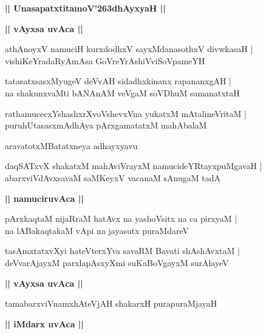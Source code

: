\documentclass[twoside,12pt,openright]{book}
\def\S{\char'263}
\newcounter{shloka}[chapter]
\def\uvaca#1{\centerline{{\large\textbf{#1}}}}
\begin{document}
\begin{center}
{\LARGE\bfseries || UnasapatxtitamoV\S dhAyxyaH || }
\end{center}

\uvaca{|| vAyxsa uvAca ||}

\begin{shloka}%
athAnoyxV namuciH kurxdodhxV sayxMdanasothxV divwkasaH |\\
vishiKeYradaRyAmAsa GoVreYrAshiVviSoVpameYH
\end{shloka}

\begin{shloka}%
tatasatxsasxMyugeV deVvAH sidadhxkinanx rapananxgAH |\\
na shakunxvaMti bANAnAM veVgaM soVDhuM samanatxtaH 
\end{shloka}

\begin{shloka}%
rathamucecxYshashxrXvoVshevxVna yukatxM mAtalineVritaM |\\
puruhUtasasxmAdhAya pArxgamatatxM mahAbalaM 
\end{shloka}

\begin{center}
aravatotxMBatatxneya adhayxyavu
\end{center}

\begin{shloka}%
daqSATxvX shakatxM mahAviVrayxM namucideYRtayxpuMgavaH |\\
abarxviVdAvxsavaM saMKeyxV vacanaM sAnugaM tadA
\end{shloka}

\uvaca{|| namuciruvAca ||}

\begin{shloka}%
pArxkaqtaM nijaRraM hatAvx na yashoVsitx na ca pirxyaM |\\
na lABakaqtakaM vApi na jayasutx puraMdareV 
\end{shloka}

\begin{shloka}%
tasAmxtatxvXyi hateVterxYva savaRM Bavati shAshAvxtaM |\\
deVvarAjayxM parxlapAsxyXmi suKaBoVgayxM surAlayeV 
\end{shloka}

\uvaca{|| vAyxsa uvAca ||}

\begin{shloka}%
tamabarxviVnamxhAteVjAH shakarxH purapuraMjayaH 
\end{shloka}

\uvaca{|| iMdarx uvAca ||}
\end{document}
